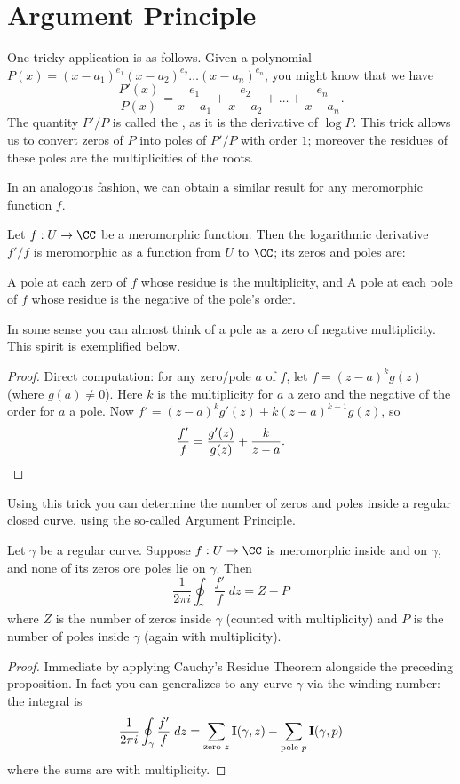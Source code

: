 \section{Argument Principle}
One tricky application is as follows.
Given a polynomial $P(x) = (x-a_1)^{e_1}(x-a_2)^{e_2}\dots(x-a_n)^{e_n}$, you might know that we have
\[ \frac{P'(x)}{P(x)} = \frac{e_1}{x-a_1} + \frac{e_2}{x-a_2} + \dots + \frac{e_n}{x-a_n}. \]
The quantity $P'/P$ is called the , as it is the derivative of $\log P$.
This trick allows us to convert zeros of $P$ into poles of $P'/P$ with order $1$;
moreover the residues of these poles are the multiplicities of the roots.

In an analogous fashion, we can obtain a similar result for any meromorphic function $f$.
\begin{proposition}
	Let $f : U \to \CC$ be a meromorphic function.
	Then the logarithmic derivative $f'/f$ is meromorphic as a function from $U$ to $\CC$;
	its zeros and poles are:
	\begin{enumerate}[(i)]
		\ii A pole at each zero of $f$ whose residue is the multiplicity, and
		\ii A pole at each pole of $f$ whose residue is the negative of the pole's order.
	\end{enumerate}
\end{proposition}
In some sense you can almost think of a pole as a zero of negative multiplicity.
This spirit is exemplified below.
\begin{proof}
	Direct computation: for any zero/pole $a$ of $f$, let $f = (z-a)^k g(z)$ (where $g(a) \neq 0$).
	Here $k$ is the multiplicity for $a$ a zero and the negative of the order for $a$ a pole.
	Now $f' = (z-a)^k g'(z) + k(z-a)^{k-1} g(z)$, so
	\[ \frac{f'}{f} = \frac{g'(z)}{g(z)} + \frac{k}{z-a}. \qedhere \]
\end{proof}

Using this trick you can determine the number of zeros and poles inside a regular closed curve,
using the so-called Argument Principle.

\begin{theorem}
	Let $\gamma$ be a regular curve.
	Suppose $f : U \to \CC$ is meromorphic inside and on $\gamma$, and
	none of its zeros ore poles lie on $\gamma$.
	Then
	\[
		\frac{1}{2\pi i} \oint_\gamma \frac{f'}{f} \; dz
		= Z - P
	\]
	where $Z$ is the number of zeros inside $\gamma$ (counted with multiplicity)
	and $P$ is the number of poles inside $\gamma$ (again with multiplicity).
\end{theorem}
\begin{proof}
	Immediate by applying Cauchy's Residue Theorem alongside the preceding proposition.
	In fact you can generalizes to any curve $\gamma$ via the winding number:
	the integral is
	\[ \frac{1}{2\pi i} \oint_\gamma \frac{f'}{f} \; dz
		= \sum_{\text{zero $z$}} \operatorname{\mathbf I}(\gamma,z)
		- \sum_{\text{pole $p$}} \operatorname{\mathbf I}(\gamma,p) \]
	where the sums are with multiplicity.
\end{proof}

